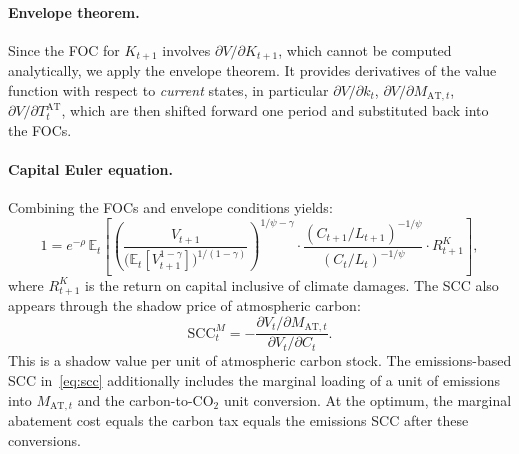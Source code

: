 \documentclass[11pt,a4paper]{report}
\begin{document}
\paragraph{Envelope theorem.}
Since the FOC for $K_{t+1}$ involves $\partial V/\partial K_{t+1}$, which cannot be computed analytically, we apply the envelope theorem.  It provides derivatives of the value function with respect to \emph{current} states, in particular $\partial V/\partial k_t$, $\partial V/\partial M_{\mathrm{AT},t}$, $\partial V/\partial T^{\mathrm{AT}}_t$, which are then shifted forward one period and substituted back into the FOCs.

\paragraph{Capital Euler equation.}
Combining the FOCs and envelope conditions yields:
\begin{equation}
1 = e^{-\rho}\,\mathbb{E}_t\!\left[\left(\frac{V_{t+1}}{\bigl(\mathbb{E}_t[V_{t+1}^{1-\gamma}]\bigr)^{1/(1-\gamma)}}\right)^{1/\psi - \gamma} \cdot \frac{(C_{t+1}/L_{t+1})^{-1/\psi}}{(C_t/L_t)^{-1/\psi}} \cdot R^K_{t+1}\right],
\label{eq:iam_euler}
\end{equation}
where $R^K_{t+1}$ is the return on capital inclusive of climate damages.  The SCC also appears through the shadow price of atmospheric carbon:
\begin{equation}
\mathrm{SCC}^{M}_t = -\frac{\partial V_t / \partial M_{\mathrm{AT},t}}{\partial V_t / \partial C_t}.
\end{equation}
This is a shadow value per unit of atmospheric carbon stock.  The emissions-based SCC in~\eqref{eq:scc} additionally includes the marginal loading of a unit of emissions into $M_{\mathrm{AT},t}$ and the carbon-to-CO$_2$ unit conversion.  At the optimum, the marginal abatement cost equals the carbon tax equals the emissions SCC after these conversions.
\end{document}
